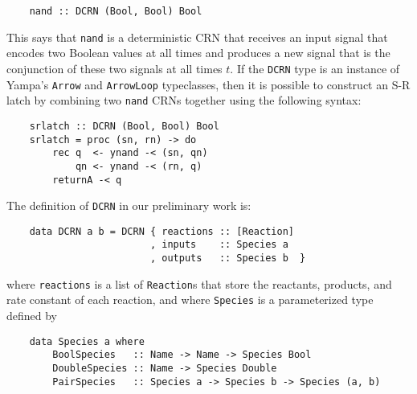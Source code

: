 \begin{lstlisting}
    nand :: DCRN (Bool, Bool) Bool
\end{lstlisting}

This says that \lstinline{nand} is a deterministic CRN that receives an input signal that encodes two Boolean values at all times and produces a new signal that is the conjunction of these two signals at all times \( t \).
If the \lstinline{DCRN} type is an instance of Yampa's \lstinline{Arrow} and \lstinline{ArrowLoop} typeclasses, then it is possible to construct an S-R latch by combining two \lstinline{nand} CRNs together using the following syntax:

\begin{lstlisting}
    srlatch :: DCRN (Bool, Bool) Bool
    srlatch = proc (sn, rn) -> do
        rec q  <- ynand -< (sn, qn)
            qn <- ynand -< (rn, q)
        returnA -< q
\end{lstlisting}

The definition of \lstinline!DCRN! in our preliminary work is:
\begin{lstlisting}
    data DCRN a b = DCRN { reactions :: [Reaction]
                         , inputs    :: Species a
                         , outputs   :: Species b  }
\end{lstlisting}
where \lstinline!reactions! is a list of \lstinline!Reaction!s that store the reactants, products, and rate constant of each reaction, and where \lstinline!Species! is a parameterized type defined by
\begin{lstlisting}
    data Species a where
        BoolSpecies   :: Name -> Name -> Species Bool
        DoubleSpecies :: Name -> Species Double
        PairSpecies   :: Species a -> Species b -> Species (a, b)
\end{lstlisting}




